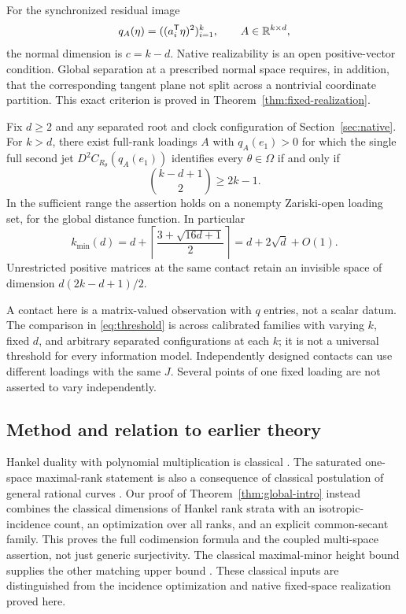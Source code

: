 For the synchronized residual image
\[
 q_A(\eta)=((a_i^{\mathsf T}\eta)^2)_{i=1}^k,\qquad A\in\mathbb R^{k\times d},
\]
the normal dimension is $c=k-d$. Native realizability is an open positive-vector condition. Global separation at a prescribed normal space requires, in addition, that the corresponding tangent plane not split across a nontrivial coordinate partition. This exact criterion is proved in Theorem~\ref{thm:fixed-realization}.
\begin{theorem}\label{thm:threshold}
Fix $d\ge2$ and any separated root and clock configuration of Section~\ref{sec:native}. For $k>d$, there exist full-rank loadings $A$ with $q_A(e_1)>0$ for which the single full second jet $D^2C_{R_\theta}(q_A(e_1))$ identifies every $\theta\in\Omega$ if and only if
\[
 \binom{k-d+1}{2}\ge2k-1.
\]
In the sufficient range the assertion holds on a nonempty Zariski-open loading set, for the global distance function. In particular
\begin{equation}\label{eq:threshold}
 k_{\min}(d)=d+\left\lceil\frac{3+\sqrt{16d+1}}2\right\rceil
            =d+2\sqrt d+O(1).
\end{equation}
Unrestricted positive matrices at the same contact retain an invisible space of dimension $d(2k-d+1)/2$.
\end{theorem}
A contact here is a matrix-valued observation with $q$ entries, not a scalar datum. The comparison in \eqref{eq:threshold} is across calibrated families with varying $k$, fixed $d$, and arbitrary separated configurations at each $k$; it is not a universal threshold for every information model. Independently designed contacts can use different loadings with the same $J$. Several points of one fixed loading are not asserted to vary independently.

\subsection*{Method and relation to earlier theory}
Hankel duality with polynomial multiplication is classical \cite{MP}. The saturated one-space maximal-rank statement is also a consequence of classical postulation of general rational curves \cite{BE85,BE87,Larson}. Our proof of Theorem~\ref{thm:global-intro} instead combines the classical dimensions of Hankel rank strata \cite[Sections 1--2]{CMSV} with an isotropic-incidence count, an optimization over all ranks, and an explicit common-secant family. This proves the full codimension formula and the coupled multi-space assertion, not just generic surjectivity. The classical maximal-minor height bound supplies the other matching upper bound \cite[Introduction]{EHU}. These classical inputs are distinguished from the incidence optimization and native fixed-space realization proved here.

